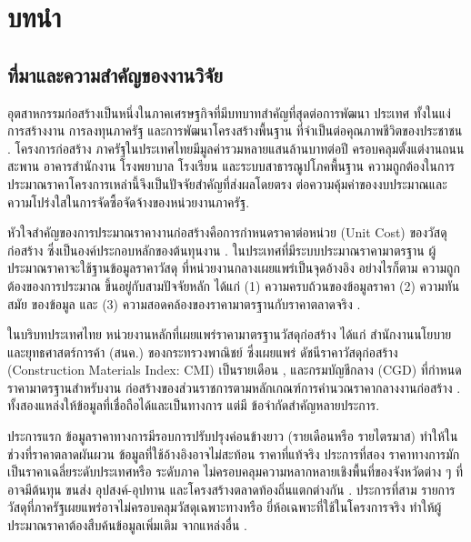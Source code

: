 \chapter{บทนำ}
\label{ch:intro}

\section{ที่มาและความสำคัญของงานวิจัย}
\label{sec:background}

อุตสาหกรรมก่อสร้างเป็นหนึ่งในภาคเศรษฐกิจที่มีบทบาทสำคัญที่สุดต่อการพัฒนา
ประเทศ ทั้งในแง่การสร้างงาน การลงทุนภาครัฐ และการพัฒนาโครงสร้างพื้นฐาน
ที่จำเป็นต่อคุณภาพชีวิตของประชาชน \cite{sirieawphikul2024}. โครงการก่อสร้าง
ภาครัฐในประเทศไทยมีมูลค่ารวมหลายแสนล้านบาทต่อปี ครอบคลุมตั้งแต่งานถนน
สะพาน อาคารสำนักงาน โรงพยาบาล โรงเรียน และระบบสาธารณูปโภคพื้นฐาน
ความถูกต้องในการประมาณราคาโครงการเหล่านี้จึงเป็นปัจจัยสำคัญที่ส่งผลโดยตรง
ต่อความคุ้มค่าของงบประมาณและความโปร่งใสในการจัดซื้อจัดจ้างของหน่วยงานภาครัฐ.

หัวใจสำคัญของการประมาณราคางานก่อสร้างคือการกำหนดราคาต่อหน่วย (Unit Cost)
ของวัสดุก่อสร้าง ซึ่งเป็นองค์ประกอบหลักของต้นทุนงาน \cite{ashworth2013}.
ในประเทศที่มีระบบประมาณราคามาตรฐาน ผู้ประมาณราคาจะใช้ฐานข้อมูลราคาวัสดุ
ที่หน่วยงานกลางเผยแพร่เป็นจุดอ้างอิง อย่างไรก็ตาม ความถูกต้องของการประมาณ
ขึ้นอยู่กับสามปัจจัยหลัก ได้แก่ (1) ความครบถ้วนของข้อมูลราคา (2) ความทันสมัย
ของข้อมูล และ (3) ความสอดคล้องของราคามาตรฐานกับราคาตลาดจริง
\cite{crone1992,leung2005}.

ในบริบทประเทศไทย หน่วยงานหลักที่เผยแพร่ราคามาตรฐานวัสดุก่อสร้าง ได้แก่
สำนักงานนโยบายและยุทธศาสตร์การค้า (สนค.) ของกระทรวงพาณิชย์ ซึ่งเผยแพร่
ดัชนีราคาวัสดุก่อสร้าง (Construction Materials Index: CMI) เป็นรายเดือน
\cite{tpso2569}, และกรมบัญชีกลาง (CGD) ที่กำหนดราคามาตรฐานสำหรับงาน
ก่อสร้างของส่วนราชการตามหลักเกณฑ์การคำนวณราคากลางงานก่อสร้าง
\cite{cgd2569}. ทั้งสองแหล่งให้ข้อมูลที่เชื่อถือได้และเป็นทางการ แต่มี
ข้อจำกัดสำคัญหลายประการ.

ประการแรก ข้อมูลราคาทางการมีรอบการปรับปรุงค่อนข้างยาว (รายเดือนหรือ
รายไตรมาส) ทำให้ในช่วงที่ราคาตลาดผันผวน ข้อมูลที่ใช้อ้างอิงอาจไม่สะท้อน
ราคาที่แท้จริง ประการที่สอง ราคาทางการมักเป็นราคาเฉลี่ยระดับประเทศหรือ
ระดับภาค ไม่ครอบคลุมความหลากหลายเชิงพื้นที่ของจังหวัดต่าง ๆ ที่อาจมีต้นทุน
ขนส่ง อุปสงค์-อุปทาน และโครงสร้างตลาดท้องถิ่นแตกต่างกัน \cite{leung2005}.
ประการที่สาม รายการวัสดุที่ภาครัฐเผยแพร่อาจไม่ครอบคลุมวัสดุเฉพาะทางหรือ
ยี่ห้อเฉพาะที่ใช้ในโครงการจริง ทำให้ผู้ประมาณราคาต้องสืบค้นข้อมูลเพิ่มเติม
จากแหล่งอื่น \cite{benchanakatkun2014}.


